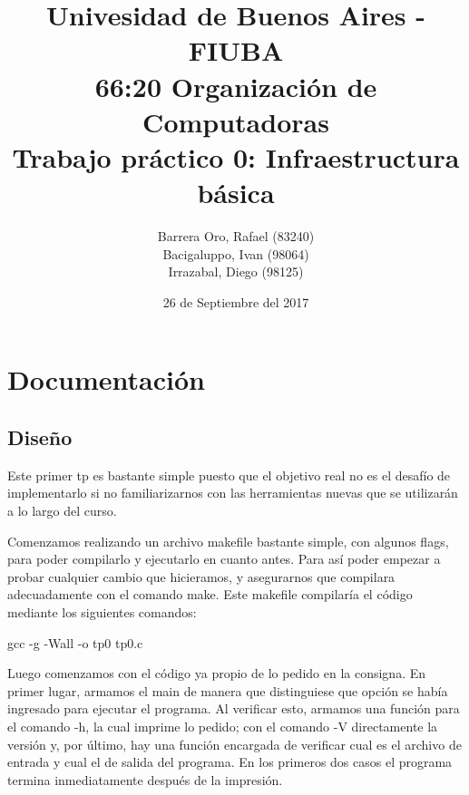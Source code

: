 \documentclass[10pt,a4paper]{article}
\begin{document}
\date{26 de Septiembre del 2017}

\title{Univesidad de Buenos Aires - FIUBA \\ 66:20 Organización de Computadoras \\ Trabajo práctico 0: Infraestructura básica}

\author{Barrera Oro, Rafael (83240) \\ Bacigaluppo, Ivan (98064) \\ Irrazabal, Diego (98125)}

\maketitle

\thispagestyle{empty}

\newpage

\setcounter{page}{1}

\tableofcontents

\newpage

\section{Documentación}

\subsection{Diseño}

Este primer tp es bastante simple puesto que el objetivo real no es el desafío de implementarlo si no familiarizarnos con las herramientas nuevas que se utilizarán a lo largo del curso.

Comenzamos realizando un archivo makefile bastante simple, con algunos flags, para poder compilarlo y ejecutarlo en cuanto antes. Para así poder empezar a probar cualquier cambio que hicieramos, y asegurarnos que compilara adecuadamente con el comando make. Este makefile compilaría el código mediante los siguientes comandos:

	gcc -g -Wall -o tp0 tp0.c

Luego comenzamos con el código ya propio de lo pedido en la consigna. En primer lugar, armamos el main de manera que distinguiese que opción se había ingresado para ejecutar el programa. Al verificar esto, armamos una función para el comando -h, la cual imprime lo pedido; con el comando -V directamente la versión y, por último, hay una función encargada de verificar cual es el archivo de entrada y cual el de salida del programa. En los primeros dos casos el programa termina inmediatamente después de la impresión.
\end{document}
